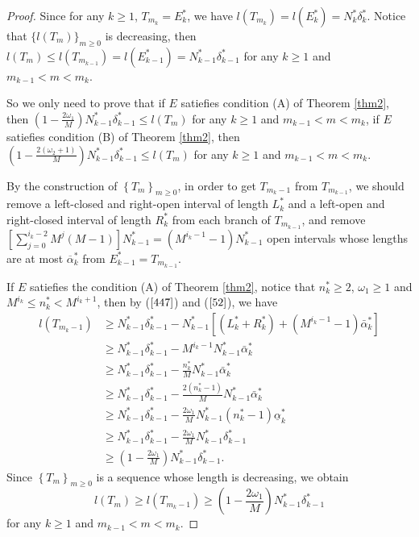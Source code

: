 \documentclass[reqno]{amsart}
\theoremstyle{plain}
\theoremstyle{definition}
\theoremstyle{remark}
\numberwithin{equation}{section} \DeclareMathOperator\intr{int}
\begin{document}
\begin{proof}
	Since for any $k\ge 1$, $T_{m_{k}}=E_{k}^{*}$, we have $l(T_{m_{k}})=l(E_{k}^{*})=N_{k}^{*}\delta_{k}^{*}$.
Notice that $\{l(T_{m})\}_{m\ge0}$ is decreasing, then
$l(T_{m})\le l(T_{m_{k-1}})=l(E_{k-1}^{*})=N_{k-1}^{*}\delta_{k-1}^{*}$ for any $k\ge 1$ and $m_{k-1}<m<m_{k}$.

    So we only need to prove that if $E$ satiefies condition {\rm(A)} of Theorem {\rm\ref{thm2}}, then
    $(1-\frac{2\omega_1}{M})N^*_{k-1}\delta^*_{k-1}\le l(T_m)$  for any $k\ge 1$ and $m_{k-1}<m<m_{k}$, if $E$ satiefies condition {\rm(B)} of Theorem {\rm\ref{thm2}}, then
    $(1-\frac{2(\omega_2+1)}{M})N_{k-1}^{*}\delta_{k-1}^{*}\le l(T_{m})$ for any $k\ge 1$ and $m_{k-1}<m<m_{k}$.

 By the construction of $\left\{T_{m}\right\}_{m\ge0}$, in order to get $T_{m_{k}-1}$ from $T_{m_{k-1}}$, we should remove a left-closed and right-open interval of length $L^*_k$ and a left-open and  right-closed interval of length  $R^*_k$ from each branch of $T_{m_{k-1}}$, and remove $[\sum_{j=0}^{i_{k}-2}M^{j}(M-1)]N_{k-1}^{*}=(M^{i_{k}-1}-1)N_{k-1}^{*}$ open intervals whose lengths are at most $\overline{\alpha}_{k}^{*}$ from  $E_{k-1}^{*}=T_{m_{k-1}}$.

 If $E$ satiefies the condition {\rm(A)} of Theorem {\rm\ref{thm2}}, notice that $n^*_k\ge 2$, $\omega_1\ge 1$ and
$M^{i_k}\le n^*_k <M^{i_k+1}$, then by ($\ref{447}$) and ($\ref{52}$), we have
\begin{equation}
\begin{aligned}
l(T_{m_k-1})&\ge N^*_{k-1}\delta^*_{k-1}-N^*_{k-1}[(L^*_k+R^*_k)+(M^{i_k-1}-1)\bar{\alpha}^*_k]\\
&\ge N^*_{k-1}\delta^*_{k-1}-M^{i_k-1}N^*_{k-1}\bar{\alpha}^*_k\\
&\ge N^*_{k-1}\delta^*_{k-1}-\frac{n^*_k}{M}N^*_{k-1}\bar{\alpha}^*_k\\
&\ge N^*_{k-1}\delta^*_{k-1}-\frac{2(n^*_k-1)}{M}N^*_{k-1}\bar{\alpha}^*_k\\
&\ge N^*_{k-1}\delta^*_{k-1}-\frac{2\omega_1}{M}N^*_{k-1}(n^*_k-1)\underline{\alpha}^*_k\\
&\ge N^*_{k-1}\delta^*_{k-1}-\frac{2\omega_1}{M}N^*_{k-1}\delta^*_{k-1}\\
&\ge (1-\frac{2\omega_1}{M})N^*_{k-1}\delta^*_{k-1}.\nonumber
\end{aligned}
\end{equation}
Since $\left\{T_{m}\right\}_{m\ge0}$ is a sequence whose length is decreasing,
we obtain
\begin{equation*}
l(T_{m})\ge l(T_{m_k-1})\ge (1-\frac{2\omega_1}{M})N^*_{k-1}\delta^*_{k-1}
\end{equation*}
for any $k\ge 1$ and $m_{k-1}<m<m_{k}$.


\end{proof}
\end{document}
